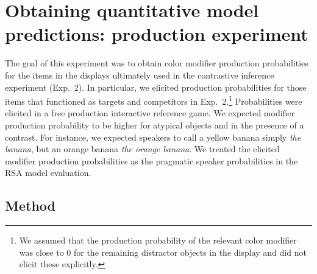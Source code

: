 \documentclass[a4paper,man,floatsintext,natbib]{apa6}
\begin{document}


\section{Obtaining quantitative model predictions: production experiment}\label{sec:prod}

The goal of this experiment was to obtain color modifier production probabilities for the items in the displays ultimately used in the contrastive inference experiment (Exp.~2). In particular, we elicited production probabilities for those items that functioned as targets and competitors in Exp.~2.\footnote{We assumed that the production probability of the relevant color modifier was close to 0 for the remaining distractor objects in the display and did not elicit these explicitly.}  Probabilities were elicited in a free production interactive reference game. We expected modifier production probability to be higher for atypical objects and in the presence of a contrast. For instance, we expected speakers to call a yellow banana simply \textit{the banana}, but an orange banana \textit{the orange banana}. We treated the elicited modifier production probabilities as the pragmatic speaker probabilities in the RSA model evaluation.

\subsection{Method}
\end{document}
